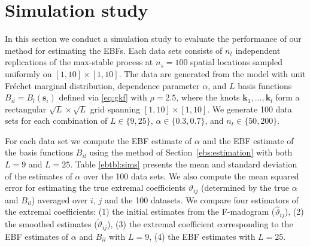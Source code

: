 \documentclass[12pt]{article}
\newcommand{\bk}{\ensuremath{\mathbf{k}}}
\newcommand{\bs}{\ensuremath{\mathbf{s}}}
\newcommand{\sref}[1]{Section~\ref{#1}}
\begin{document}
\section{Simulation study}\label{ebs:sims}

In this section we conduct a simulation study to evaluate the performance of our method for estimating the EBFs.  Each data sets consists of $n_t$ independent replications of the max-stable process at $n_s=100$ spatial locations sampled uniformly on $[1,10]\times [1,10]$.  The data are generated from the \citet{Reich2012} model with unit Fr\'echet marginal distribution, dependence parameter $\alpha$, and $L$ basis functions $B_{il}=B_l(\bs_i)$ defined via \eqref{eq:gkf} with $\rho=2.5$, where the knots $\bk_1,...,\bk_l$ form a rectangular $\sqrt{L}\times \sqrt{L}$ grid spanning $[1,10]\times [1,10]$. 
We generate 100 data sets for each combination of $L\in\{9,25\}$, $\alpha\in\{0.3,0.7\}$, and $n_t\in\{50,200\}$.

For each data set we compute the EBF estimate of $\alpha$ and the EBF estimate of the basis functions $B_{il}$ using the method of \sref{ebs:estimation} with both $L=9$ and $L=25$.  Table \ref{ebtbl:sims} presents the mean and standard deviation of the estimates of $\alpha$ over the 100 data sets.  We also compute the mean squared error for estimating the true extremal coefficients $\vartheta_{ij}$ (determined by the true $\alpha$ and $B_{il}$) averaged over $i$, $j$ and the 100 datasets.  We compare four estimators of the extremal coefficients: (1) the initial estimates from the F-madogram (${\hat \vartheta}_{ij}$), (2) the smoothed estimates (${\tilde \vartheta}_{ij}$), (3) the extremal coefficient corresponding to the EBF estimates of $\alpha$ and $B_{il}$ with $L=9$, (4) the EBF estimates with $L=25$. 
\end{document}
